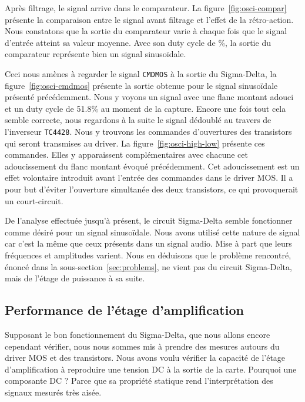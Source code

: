 \documentclass[10pt, oneside, a4paper]{article}
\begin{document}
Après filtrage, le signal arrive dans le comparateur.
La figure~\ref{fig:osci-compar} présente la comparaison entre le signal avant filtrage et l'effet de la rétro-action.
Nous constatons que la sortie du comparateur varie à chaque fois que le signal d'entrée atteint sa valeur moyenne.
Avec son duty cycle de \%, la sortie du comparateur représente bien un signal sinusoïdale.

Ceci nous amènes à regarder le signal \texttt{CMDMOS} à la sortie du Sigma-Delta, la figure~\ref{fig:osci-cmdmos} présente la sortie obtenue pour le signal sinusoïdale présenté précédemment.
Nous y voyons un signal avec une flanc montant adouci et un duty cycle de \num{51.8}\% au moment de la capture.
Encore une fois tout cela semble correcte, nous regardons à la suite le signal dédoublé au travers de l'inverseur \texttt{TC4428}.
Nous y trouvons les commandes d'ouvertures des transistors qui seront transmises au driver.
La figure~\ref{fig:osci-high-low} présente ces commandes.
Elles y apparaissent complémentaires avec chacune cet adoucissement du flanc montant évoqué précédemment.
Cet adoucissement est un effet volontaire introduit avant l'entrée des commandes dans le driver MOS.
Il a pour but d'éviter l'ouverture simultanée des deux transistors, ce qui provoquerait un court-circuit.

De l'analyse effectuée jusqu'à présent, le circuit Sigma-Delta semble fonctionner comme désiré pour un signal sinusoïdale.
Nous avons utilisé cette nature de signal car c'est la même que ceux présents dans un signal audio.
Mise à part que leurs fréquences et amplitudes varient.
Nous en déduisons que le problème rencontré, énoncé dans la sous-section~\ref{sec:problems}, ne vient pas du circuit Sigma-Delta, mais de l'étage de puissance à sa suite.

\subsection{Performance de l'étage d'amplification}
Supposant le bon fonctionnement du Sigma-Delta, que nous allons encore cependant vérifier, nous nous sommes mis à prendre des mesures autours du driver MOS et des transistors.
Nous avons voulu vérifier la capacité de l'étage d'amplification à reproduire une tension DC à la sortie de la carte.
Pourquoi une composante DC ?
Parce que sa propriété statique rend l'interprétation des signaux mesurés très aisée.
\end{document}
